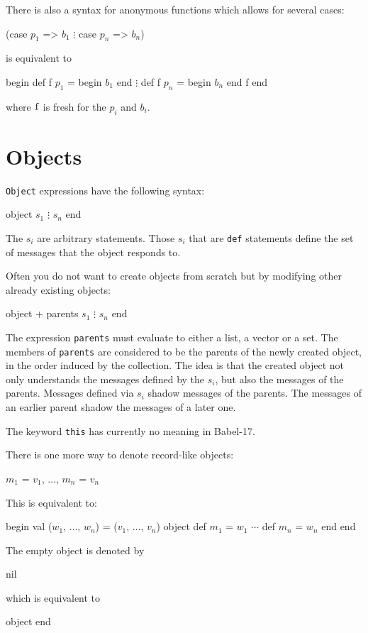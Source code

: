 \documentclass[11pt]{amsart}
\newcommand{\babelsrc}[1] {\lstinline!#1!}
\begin{document}
There is also a syntax for anonymous functions which allows for several cases:
\begin{babellisting}
(case $p_1$ => $b_1$
    $\vdots$
 case $p_n$ => $b_n$)
\end{babellisting}
is equivalent to 
\begin{babellisting}
begin
  def f $p_1$ = begin $b_1$ end
    $\vdots$
  def f $p_n$ = begin $b_n$ end
  f
end
\end{babellisting}
where $\babelsrc{f}$ is fresh for the $p_i$ and $b_i$.

\section{Objects}
\babelsrc{Object} expressions have the following syntax:
\begin{babellisting}
object 
  $s_1$
  $\vdots$
  $s_n$
end
\end{babellisting}
The $s_i$ are arbitrary statements.  Those $s_i$ that are  \babelsrc{def} statements define the set of messages that the object responds to.

Often you do not want to create objects from scratch but by modifying other already existing objects:
\begin{babellisting}
object + parents
  $s_1$
  $\vdots$
  $s_n$
end
\end{babellisting}
The expression \babelsrc{parents} must evaluate to either a list, a vector or a set. The members of  \babelsrc{parents}
are considered to be the parents of the newly created object, in the order induced by the collection. The idea is that the created object not only understands the messages defined by the $s_i$, but also the messages of the parents. Messages defined via $s_i$ shadow messages of the parents. The messages of an earlier parent shadow the messages of a later one.

The keyword \babelsrc{this} has currently no meaning in Babel-17.

\noindent There is one more way to denote record-like objects:
\begin{babellisting}
{ $m_1$ = $v_1$, $\ldots$, $m_n$ = $v_n$ }
\end{babellisting}
This is equivalent to:
\begin{babellisting}
begin
  val ($w_1$, $\ldots$, $w_n$) = ($v_1$, $\ldots$, $v_n$)
  object
    def $m_1$ = $w_1$
    $\cdots$
    def $m_n$ = $w_n$
  end
end
\end{babellisting}
The empty object is denoted by
\begin{babellisting}
nil
\end{babellisting}
which is equivalent to
\begin{babellisting}
object end
\end{babellisting}
\end{document}
